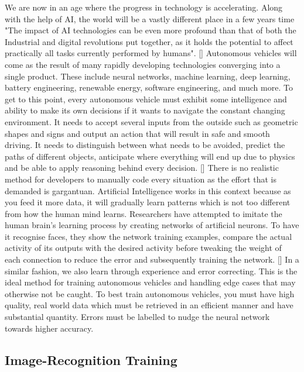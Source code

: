 \documentclass{article}
\begin{document}
We are now in an age where the progress in technology is accelerating. Along with the help of AI, the world will be a vastly different place in a few years time "The impact of AI technologies can be even more profound than that of both the Industrial and digital revolutions put together, as it holds the potential to affect practically all tasks currently performed by humans". [\textcite{makridakis2017forthcoming}] Autonomous vehicles will come as the result of many rapidly developing technologies converging into a single product. These include neural networks, machine learning, deep learning, battery engineering, renewable energy, software engineering, and much more. 
\bigbreak
To get to this point, every autonomous vehicle must exhibit some intelligence and ability to make its own decisions if it wants to navigate the constant changing environment. It needs to accept several inputs from the outside such as geometric shapes and signs and output an action that will result in safe and smooth driving. It needs to distinguish between what needs to be avoided, predict the paths of different objects, anticipate where everything will end up due to physics and be able to apply reasoning behind every decision. [\textcite{pomerol1997artificial}] There is no realistic method for developers to manually code every situation as the effort that is demanded is gargantuan.  
\bigbreak
Artificial Intelligence works in this context because as you feed it more data, it will gradually learn patterns which is not too different from how the human mind learns. Researchers have attempted to imitate the human brain's learning process by creating networks of artificial neurons. To have it recognise faces, they show the network training examples, compare the actual activity of its outputs with the desired activity before tweaking the weight of each connection to reduce the error and subsequently training the network. [\textcite{hinton1992neural}] In a similar fashion, we also learn through experience and error correcting. This is the ideal method for training autonomous vehicles and handling edge cases that may otherwise not be caught. To best train autonomous vehicles, you must have high quality, real world data which must be retrieved in an efficient manner and have substantial quantity. Errors must be labelled to nudge the neural network towards higher accuracy.

\subsection{Image-Recognition Training}
\end{document}
